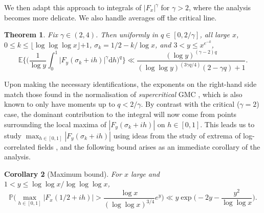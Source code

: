 \documentclass{amsart}
\newtheorem{theorem}{Theorem}[section]
\newtheorem{cor}[theorem]{Corollary}
\theoremstyle{definition}
\theoremstyle{remark}
\numberwithin{equation}{section}
\begin{document}
We then adapt this approach to integrals of $|F_x|^{\gamma}$ for $\gamma>2$, where the analysis becomes more delicate. We also handle averages off the critical line.
 
\begin{theorem}\label{thm:mainbound} Fix $\gamma\in (2,4)$. Then uniformly in $q\in [0,2/\gamma]$, all large $x$, $0\leq k\leq \lfloor \log\log\log x\rfloor{+1}$, $\sigma_k=1/2-k/\log x$, and $3<y\leq x^{e^{-k}}$,
\begin{equation}\label{eq:mainbound}
    \mathbb{E}\bigg\{\bigg(\frac{1}{\log y}\int_{0}^1 \big|F_y(\sigma_k+ih)\big|^\gamma\mathrm{d}h\bigg)^q\bigg\}\ll \frac{(\log y)^{(\gamma-2)q}}{(\log\log y)^{(3\gamma q/4)}(2-\gamma q)+1}.
\end{equation}
\end{theorem}
Upon making the necessary identifications, the exponents on the right-hand side match those found in the normalisation of \textit{supercritical} GMC \cite{glassy}, which is also known to only have moments up to $q<2/\gamma$.  By contrast with the critical ($\gamma=2$) case, the dominant contribution to the integral will now come from points surrounding the local maxima of $|F_y(\sigma_k+ih)|$ on $h\in [0,1]$. This leads us to study $\max_{h\in [0,1]}|F_y(\sigma_k+ih)|$ using ideas from the study of extrema of log-correlated fields \cite{BramsonDingZeitouni,Bramson}, and the following bound arises as an immediate corollary of the analysis.

\begin{cor}[Maximum bound]\label{cor:maximum} For $x$ large and $1<y\leq \log\log x/\log\log\log x$,
\[
    \mathbb{P}\bigg(\max_{h\in [0,1]}|F_x(1/2+ih)|>\frac{\log x}{(\log\log x)^{3/4}}e^y\bigg)\ll y\exp{\Big(\!-2y-\frac{y^2}{\log\log x}\Big)}.
\]
\end{cor}
\end{document}

